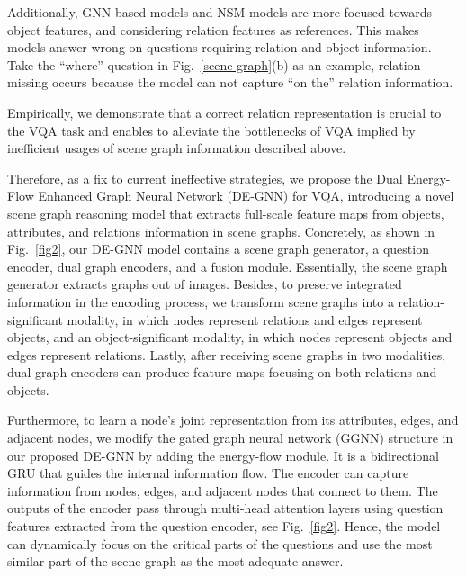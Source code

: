\documentclass[letterpaper]{article} %
\begin{document}
Additionally, GNN-based models and NSM models are more focused towards object features, and considering relation features as references. This makes models answer wrong on questions requiring relation and object information. Take the ``where'' question in Fig.~\ref{scene-graph}(b) as an example, relation missing occurs because the model can not capture ``on the'' relation information.

Empirically, we demonstrate that a correct relation representation is crucial to the VQA task and enables to alleviate the bottlenecks of VQA implied by inefficient usages of scene graph information described above.

Therefore, as a fix to current ineffective strategies, we propose the Dual Energy-Flow Enhanced Graph Neural Network (DE-GNN) for VQA, introducing a novel scene graph reasoning model that extracts full-scale feature maps from objects, attributes, and relations information in scene graphs. 
Concretely, as shown in Fig.~\ref{fig2}, our DE-GNN model contains a scene graph generator, a question encoder, dual graph encoders, and a fusion module. 
Essentially, the scene graph generator extracts graphs out of images. 
Besides, to preserve integrated information in the encoding process, we transform scene graphs into a relation-significant modality, in which nodes represent relations and edges represent objects, and an object-significant modality, in which nodes represent objects and edges represent relations. Lastly, after receiving scene graphs in two modalities, dual graph encoders can produce feature maps focusing on both relations and objects.

Furthermore, to learn a node's joint representation from its attributes, edges, and adjacent nodes, we modify the gated graph neural network (GGNN) structure in our proposed DE-GNN by adding the energy-flow module. 
It is a bidirectional GRU that guides the internal information flow.
The encoder can capture information from nodes, edges, and adjacent nodes that connect to them. 
The outputs of the encoder pass through multi-head attention layers using question features extracted from the question encoder, see Fig.~\ref{fig2}. 
Hence, the model can dynamically focus on the critical parts of the questions and use the most similar part of the scene graph as the most adequate answer.
\end{document}
